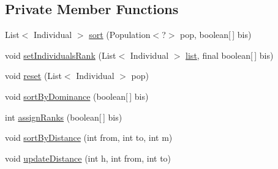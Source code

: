 \subsection*{Private Member Functions}
\begin{DoxyCompactItemize}
\item 
List$<$ Individual $>$ \hyperlink{classjenes_1_1population_1_1_fitness_3_01_c_01extends_01_chromosome_01_4_1_1_sorter_ab4d160b9f25c9bd4b69352da4d790fca}{sort} (Population$<$?$>$ pop, boolean\mbox{[}$\,$\mbox{]} bis)
\item 
void \hyperlink{classjenes_1_1population_1_1_fitness_3_01_c_01extends_01_chromosome_01_4_1_1_sorter_a1290180a1519d3d4dc91da403f360a22}{set\-Individuals\-Rank} (List$<$ Individual $>$ \hyperlink{classjenes_1_1population_1_1_fitness_3_01_c_01extends_01_chromosome_01_4_1_1_sorter_a4dd2dfbe2ebcf33bed654b95507fb239}{list}, final boolean\mbox{[}$\,$\mbox{]} bis)
\item 
void \hyperlink{classjenes_1_1population_1_1_fitness_3_01_c_01extends_01_chromosome_01_4_1_1_sorter_a3332a86889a4923c4dc3223867727abe}{reset} (List$<$ Individual $>$ pop)
\item 
void \hyperlink{classjenes_1_1population_1_1_fitness_3_01_c_01extends_01_chromosome_01_4_1_1_sorter_a813d438dc95c070a1c1da6feaa8d31d4}{sort\-By\-Dominance} (boolean\mbox{[}$\,$\mbox{]} bis)
\item 
int \hyperlink{classjenes_1_1population_1_1_fitness_3_01_c_01extends_01_chromosome_01_4_1_1_sorter_a73a1300f8544782f918b09408dccee6f}{assign\-Ranks} (boolean\mbox{[}$\,$\mbox{]} bis)
\item 
void \hyperlink{classjenes_1_1population_1_1_fitness_3_01_c_01extends_01_chromosome_01_4_1_1_sorter_aeca45d3eafa9ea57e97ba47017e0aae9}{sort\-By\-Distance} (int from, int to, int m)
\item 
void \hyperlink{classjenes_1_1population_1_1_fitness_3_01_c_01extends_01_chromosome_01_4_1_1_sorter_ab1b7b7c31d60f51b791cf0ff0289fc4b}{update\-Distance} (int h, int from, int to)
\end{DoxyCompactItemize}

